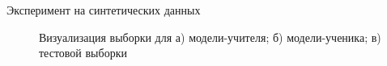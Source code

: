 \documentclass[12pt, aspectratio=169]{beamer}
\begin{document}
\begin{frame}{Эксперимент на синтетических данных}
\begin{figure}
\begin{minipage}[h]{0.3\linewidth}
    \end{minipage}
    \begin{minipage}[h]{0.3\linewidth}
    \end{minipage}
    \vspace{-0.2 cm}
    \caption*{\fontsize{8}{5}\selectfont
    Визуализация выборки для а) модели-учителя; б) модели-ученика; в) тестовой выборки}
\end{figure}
\end{frame}
\end{document}

